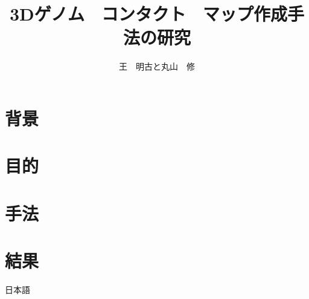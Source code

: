 \documentclass[uplatex,dvipdfmx]{jsarticle}
\begin{document}
\title{3Dゲノム　コンタクト　マップ作成手法の研究}
\author{王　明古と丸山　修}
\maketitle
\section{背景}
\section{目的}
\section{手法}
\section{結果}
日本語
\end{document}
